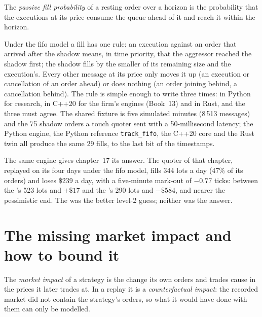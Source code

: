 \begin{definition}\label{def:rs:order-book-replay-simulation:passive}
The \emph{passive fill probability} of a resting order over a horizon is the probability that the executions at its price
consume the queue ahead of it and reach it within the horizon.
\end{definition}

Under the fifo model a fill has one rule: an execution against an order that arrived after the shadow means, in time priority, that the aggressor reached
the shadow first; the shadow fills by the smaller of its remaining size and the execution's. Every other message at its price only moves it up (an
execution or cancellation of an order ahead) or does nothing (an order joining behind, a cancellation behind). The rule is simple enough to write three
times: in Python for research, in C++20 for the firm's engines (Book~13) and in Rust, and the three must agree. The shared fixture is five simulated
minutes (8\,513 messages) and the 75 shadow orders a touch quoter sent with a 50-millisecond latency; the Python engine, the Python reference
\texttt{track\_fifo}, the C++20 core and the Rust twin all produce the same 29 fills, to the last bit of the timestamps.

The same engine gives chapter~17 its answer. The  quoter of that chapter, replayed on its four days under the fifo model, fills 344 lots a day (47\% of
its orders) and loses \$239 a day, with a five-minute mark-out of $-0.77$ ticks: between the 's 523 lots and $+\$17$ and the 's
290 lots and $-\$584$, and nearer the pessimistic end. The  was the better level-2 guess; neither was the answer.

\section{The missing market impact and how to bound it}

\begin{definition}\label{def:rs:order-book-replay-simulation:impact}
The \emph{market impact} of a strategy is the change its own orders and trades cause in the prices it later trades at. In a replay
it is a \emph{counterfactual impact}: the recorded market did not contain the strategy's orders, so what it would have
done with them can only be modelled.
\end{definition}

